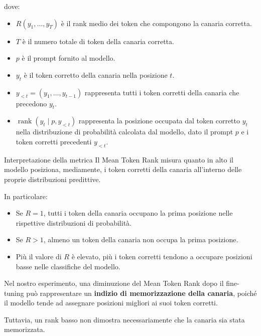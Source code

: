 dove:
\begin{itemize}
    \item $R(y_1,\ldots,y_T)$ è il rank medio dei token che compongono la canaria corretta.
    
    \item $T$ è il numero totale di token della canaria corretta.
    
    \item $p$ è il prompt fornito al modello.
    
    \item $y_t$ è il token corretto della canaria nella posizione $t$.
    
    \item $y_{<t}=(y_1,\ldots,y_{t-1})$ rappresenta tutti i token corretti della canaria che precedono $y_t$.
    
    \item $\operatorname{rank}(y_t\mid p,y_{<t})$ rappresenta la posizione occupata dal token corretto $y_t$ nella distribuzione di probabilità calcolata dal modello, dato il prompt $p$ e i token corretti precedenti $y_{<t}$.
\end{itemize}

\begin{observation}{Interpretazione della metrica}
Il Mean Token Rank misura quanto in alto il modello posiziona, mediamente, i token corretti della canaria all'interno delle proprie distribuzioni predittive.

In particolare:
\begin{itemize}
    \item Se $R=1$, tutti i token della canaria occupano la prima posizione nelle rispettive distribuzioni di probabilità.
    
    \item Se $R>1$, almeno un token della canaria non occupa la prima posizione.
    
    \item Più il valore di $R$ è elevato, più i token corretti tendono a occupare posizioni basse nelle classifiche del modello.
\end{itemize}

Nel nostro esperimento, una diminuzione del Mean Token Rank dopo il fine-tuning può rappresentare un \textbf{indizio di memorizzazione della canaria}, poiché il modello tende ad assegnare posizioni migliori ai suoi token corretti.

Tuttavia, un rank basso non dimostra necessariamente che la canaria sia stata memorizzata.
\end{observation}

